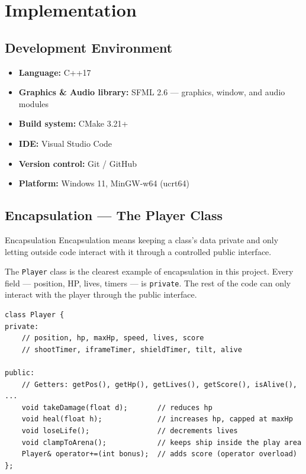 \documentclass[11pt]{article}
\begin{document}
\clearpage
\section{Implementation}

\subsection{Development Environment}
\begin{itemize}
    \item \textbf{Language:} C++17
    \item \textbf{Graphics \& Audio library:} SFML 2.6 --- graphics, window, and audio modules
    \item \textbf{Build system:} CMake 3.21+
    \item \textbf{IDE:} Visual Studio Code
    \item \textbf{Version control:} Git / GitHub
    \item \textbf{Platform:} Windows 11, MinGW-w64 (ucrt64)
\end{itemize}

\subsection{Encapsulation --- The Player Class}

\begin{conceptbox}{Encapsulation}
Encapsulation means keeping a class's data private and only letting outside
code interact with it through a controlled public interface.
\end{conceptbox}

The \texttt{Player} class is the clearest example of encapsulation in this
project. Every field --- position, HP, lives, timers --- is \texttt{private}.
The rest of the code can only interact with the player through the public
interface.

\begin{lstlisting}[caption={Player class skeleton (Player.h)}]
class Player {
private:
    // position, hp, maxHp, speed, lives, score
    // shootTimer, iframeTimer, shieldTimer, tilt, alive

public:
    // Getters: getPos(), getHp(), getLives(), getScore(), isAlive(), ...
    void takeDamage(float d);       // reduces hp
    void heal(float h);             // increases hp, capped at maxHp
    void loseLife();                // decrements lives
    void clampToArena();            // keeps ship inside the play area
    Player& operator+=(int bonus);  // adds score (operator overload)
};
\end{lstlisting}
\end{document}
